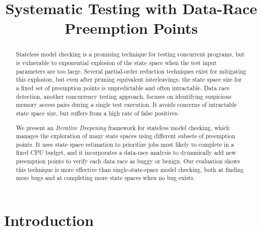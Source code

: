 \documentclass[pldi]{sigplanconf-pldi15}
\begin{document}
%
%

\title{Systematic Testing with Data-Race Preemption Points}

\maketitle
\begin{abstract}
Stateless model checking is a promising technique for testing concurrent programs,
but is vulnerable to exponential explosion of the state space when the test input parameters are too large.
Several partial-order reduction techniques exist for mitigating this explosion,
but even after pruning equivalent interleavings, the state space size for a fixed set of preemption points is unpredictable and often intractable.
%
Data race detection, another concurrency testing approach, focuses on identifying suspicious memory access pairs during a single test execution.
It avoids concerns of intractable state space size, but suffers from a high rate of false positives.

We present an {\em Iterative Deepening} framework for stateless model checking,
which manages the exploration of many state spaces using different subsets of preemption points.
It uses state space estimation to prioritize jobs most likely to complete in a fixed CPU budget,
and it incorporates a data-race analysis to dynamically add new preemption points to verify each data race as buggy or benign.
%
Our evaluation shows this technique is
more effective than single-state-space model checking, both at finding more bugs and at completing more state spaces when no bug exists.

\end{abstract}

\section{Introduction}
\end{document}
